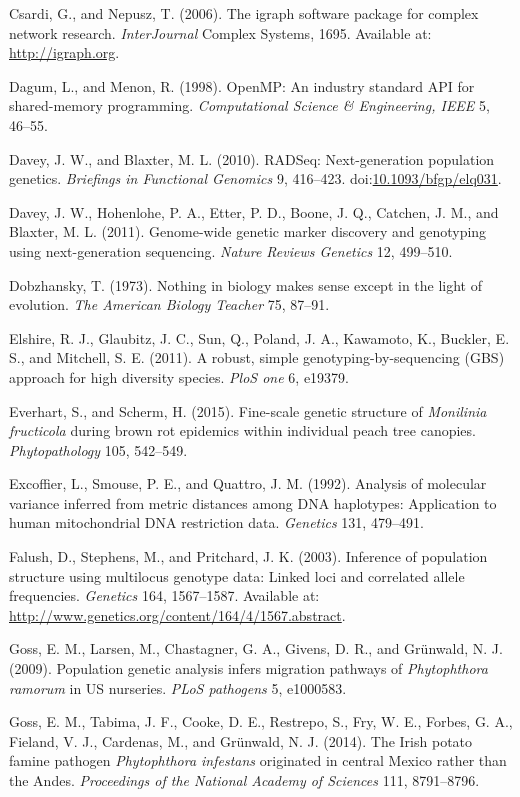\documentclass{frontiersSCNS} %
\begin{document}
Csardi, G., and Nepusz, T. (2006). The igraph software package for
complex network research. \emph{InterJournal} Complex Systems, 1695.
Available at: \url{http://igraph.org}.

Dagum, L., and Menon, R. (1998). OpenMP: An industry standard API for
shared-memory programming. \emph{Computational Science \& Engineering,
IEEE} 5, 46--55.

Davey, J. W., and Blaxter, M. L. (2010). RADSeq: Next-generation
population genetics. \emph{Briefings in Functional Genomics} 9,
416--423.
doi:\href{http://dx.doi.org/10.1093/bfgp/elq031}{10.1093/bfgp/elq031}.

Davey, J. W., Hohenlohe, P. A., Etter, P. D., Boone, J. Q., Catchen, J.
M., and Blaxter, M. L. (2011). Genome-wide genetic marker discovery and
genotyping using next-generation sequencing. \emph{Nature Reviews
Genetics} 12, 499--510.

Dobzhansky, T. (1973). Nothing in biology makes sense except in the
light of evolution. \emph{The American Biology Teacher} 75, 87--91.

Elshire, R. J., Glaubitz, J. C., Sun, Q., Poland, J. A., Kawamoto, K.,
Buckler, E. S., and Mitchell, S. E. (2011). A robust, simple
genotyping-by-sequencing (GBS) approach for high diversity species.
\emph{PloS one} 6, e19379.

Everhart, S., and Scherm, H. (2015). Fine-scale genetic structure of
\emph{Monilinia fructicola} during brown rot epidemics within individual
peach tree canopies. \emph{Phytopathology} 105, 542--549.

Excoffier, L., Smouse, P. E., and Quattro, J. M. (1992). Analysis of
molecular variance inferred from metric distances among DNA haplotypes:
Application to human mitochondrial DNA restriction data. \emph{Genetics}
131, 479--491.

Falush, D., Stephens, M., and Pritchard, J. K. (2003). Inference of
population structure using multilocus genotype data: Linked loci and
correlated allele frequencies. \emph{Genetics} 164, 1567--1587.
Available at: \url{http://www.genetics.org/content/164/4/1567.abstract}.

Goss, E. M., Larsen, M., Chastagner, G. A., Givens, D. R., and
Gr{\"{u}}nwald, N. J. (2009). Population genetic analysis infers migration
pathways of \emph{Phytophthora ramorum} in US nurseries. \emph{PLoS
pathogens} 5, e1000583.

Goss, E. M., Tabima, J. F., Cooke, D. E., Restrepo, S., Fry, W. E.,
Forbes, G. A., Fieland, V. J., Cardenas, M., and Gr{\"{u}}nwald, N. J.
(2014). The Irish potato famine pathogen \emph{Phytophthora infestans}
originated in central Mexico rather than the Andes. \emph{Proceedings of
the National Academy of Sciences} 111, 8791--8796.
\end{document}
